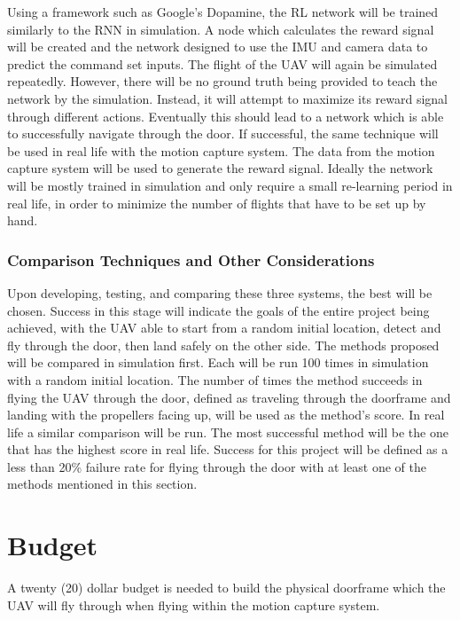 \documentclass[12pt]{article}
\begin{document}
Using a framework such as Google's Dopamine\cite{Dopamine}, the RL network will be trained similarly to the RNN in simulation. A node which calculates the reward signal will be created and the network designed to use the IMU and camera data to predict the command set inputs. The flight of the UAV will again be simulated repeatedly. However, there will be no ground truth being provided to teach the network by the simulation. Instead, it will attempt to maximize its reward signal through different actions. Eventually this should lead to a network which is able to successfully navigate through the door. If successful, the same technique will be used in real life with the motion capture system. The data from the motion capture system will be used to generate the reward signal. Ideally the network will be mostly trained in simulation and only require a small re-learning period in real life, in order to minimize the number of flights that have to be set up by hand. 

\subsubsection{Comparison Techniques and Other Considerations}
Upon developing, testing, and comparing these three systems, the best will be chosen. Success in this stage will indicate the goals of the entire project being achieved, with the UAV able to start from a random initial location, detect and fly through the door, then land safely on the other side. The methods proposed will be compared in simulation first. Each will be run 100 times in simulation with a random initial location. The number of times the method succeeds in flying the UAV through the door, defined as traveling through the doorframe and landing with the propellers facing up, will be used as the method's score. In real life a similar comparison will be run. The most successful method will be the one that has the highest score in real life. Success for this project will be defined as a less than 20\% failure rate for flying through the door with at least one of the methods mentioned in this section. 



\section{Budget}
A twenty (20) dollar budget is needed to build the physical doorframe which the UAV will fly through when flying within the motion capture system. 
\end{document}
